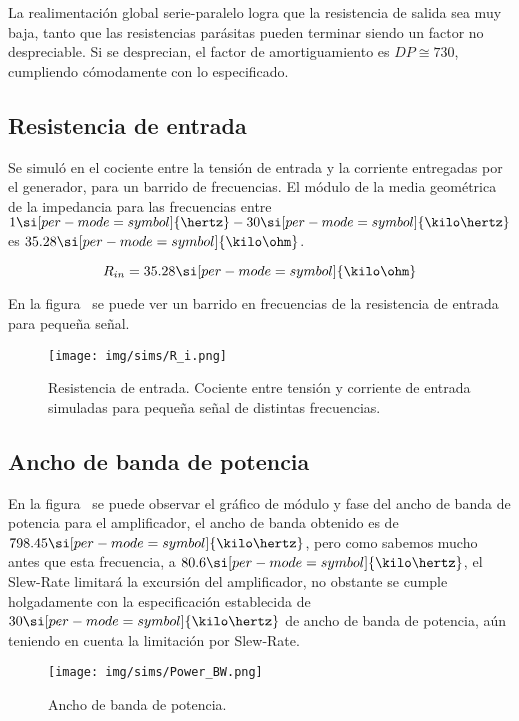 La realimentación global serie-paralelo logra que la resistencia de salida sea muy baja, tanto que las resistencias parásitas pueden terminar siendo un factor no despreciable. Si se desprecian, el factor de amortiguamiento es  $DP \cong 730$, cumpliendo cómodamente con lo especificado.



\subsection{Resistencia de entrada}

Se simuló en el cociente entre la tensión de entrada y la corriente entregadas por el generador, para un barrido de frecuencias. El módulo de la media geométrica de la impedancia para las frecuencias entre $1 \si[per-mode=symbol]{\hertz}-30 \si[per-mode=symbol]{\kilo\hertz}$ es $35.28 \si[per-mode=symbol]{\kilo\ohm}$.

\[ R_{in}=35.28 \si[per-mode=symbol]{\kilo\ohm} \]

En la figura~ se puede ver un barrido en frecuencias de la resistencia de entrada para pequeña señal.


\begin{figure}[H]
	\centering
	\texttt{[image: img/sims/R\_i.png]}
	\caption{Resistencia de entrada. Cociente entre tensión y corriente de entrada simuladas para pequeña señal de distintas frecuencias.}
	\label{fig:R_i}
\end{figure}



\subsection{Ancho de banda de potencia}


En la figura~ se puede observar el gráfico de módulo y fase del ancho de banda de potencia para el amplificador, el ancho de banda obtenido es de $798.45 \si[per-mode=symbol]{\kilo\hertz}$, pero como sabemos mucho antes que esta frecuencia, a $80.6 \si[per-mode=symbol]{\kilo\hertz}$, el Slew-Rate limitará la excursión del amplificador, no obstante se cumple holgadamente con la especificación establecida de  $30 \si[per-mode=symbol]{\kilo\hertz}$ de ancho de banda de potencia, aún teniendo en cuenta la limitación por Slew-Rate.


\clearpage

\begin{figure}[H]
	\centering
	\texttt{[image: img/sims/Power\_BW.png]}
	\caption{Ancho de banda de potencia.}
	\label{fig:power_BW}
\end{figure}

\clearpage




